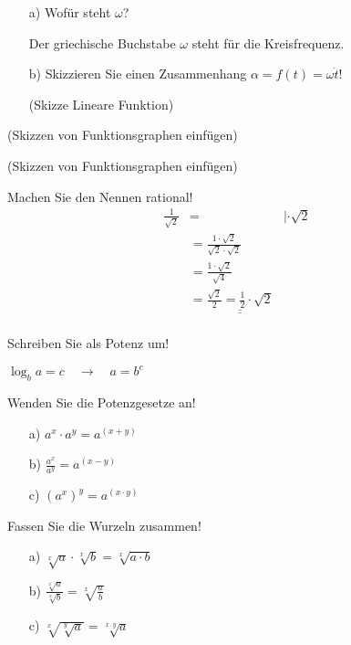\label{sec:aufgabe5}
\begin{itemize}[leftmargin=*]
    \item[a)] Wofür steht $\omega$?
    \item[] Der griechische Buchstabe $\omega$ steht für die Kreisfrequenz.
    \item[b)] Skizzieren Sie einen Zusammenhang $\alpha = f(t) = \omega \dot t$!
    \item[] (Skizze Lineare Funktion)  
\end{itemize}

\label{sec:aufgabe6}
(Skizzen von Funktionsgraphen einfügen)

\label{sec:aufgabe7}
(Skizzen von Funktionsgraphen einfügen)

\label{sec:aufgabe8}
Machen Sie den Nennen rational!
\begin{align*}
    \frac{1}{\sqrt{2}} &=  & |\cdot \sqrt{2} \\
                       &= \frac{1 \cdot \sqrt{2}}{\sqrt{2} \cdot \sqrt{2}} & \\
                       &= \frac{1 \cdot \sqrt{2}}{\sqrt{4}} & \\
                       &= \underline{\underline{\frac{\sqrt{2}}{2} = \frac{1}{2} \cdot \sqrt{2}}} & \\
\end{align*}

\label{sec:aufgabe9}
Schreiben Sie als Potenz um!

$\log_{b}a = c \quad \rightarrow \quad a = b^c$

\label{sec:aufgabe10}
Wenden Sie die Potenzgesetze an!

\begin{itemize}[leftmargin=*]
    \item[a)] $a^x \cdot a^y = a^{(x+y)}$
    \item[b)] $\frac{a^x}{a^y} = a^{(x-y)}$
    \item[c)] $\left(a^x\right)^y = a^{(x \cdot y)}$
\end{itemize}

\label{sec:aufgabe11}
Fassen Sie die Wurzeln zusammen!

\begin{itemize}[leftmargin=*]
    \item[a)] $\sqrt[x]{a} \cdot \sqrt[x]{b} = \sqrt[x]{a \cdot b }$
    \item[b)] $\frac{\sqrt[x]{a}}{\sqrt[x]{b}} = \sqrt[x]{\frac{a}{b}}$
    \item[c)] $\sqrt[x]{\sqrt[y]{a}} = \sqrt[x \cdot y]{a}$  
\end{itemize}

